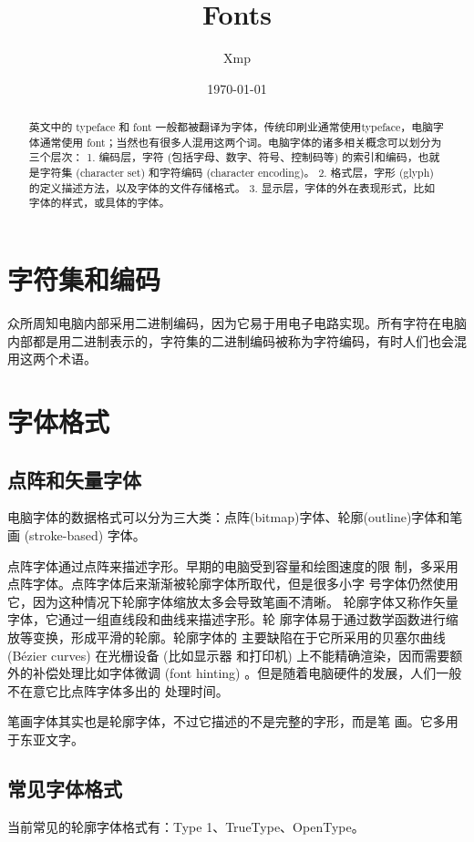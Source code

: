 \documentclass[UTF8]{article}
\title{Fonts}
\author{Xmp}
\date{\today}
\begin{document}
\maketitle
\tableofcontents
\newpage
\begin{abstract}
英文中的 typeface 和 font 一般都被翻译为字体，传统印刷业通常使用typeface，电脑字体通常使用 font；当然也有很多人混用这两个词。电脑字体的诸多相关概念可以划分为三个层次：
1. 编码层，字符 (包括字母、数字、符号、控制码等) 的索引和编码，也就是字符集 (character set) 和字符编码 (character encoding)。
2. 格式层，字形 (glyph) 的定义描述方法，以及字体的文件存储格式。
3. 显示层，字体的外在表现形式，比如字体的样式，或具体的字体。
\end{abstract}

\section{字符集和编码}	
众所周知电脑内部采用二进制编码，因为它易于用电子电路实现。所有字符在电脑内部都是用二进制表示的，字符集的二进制编码被称为字符编码，有时人们也会混用这两个术语。	

\section{字体格式}
\subsection{点阵和矢量字体}
电脑字体的数据格式可以分为三大类：点阵(bitmap)字体、轮廓(outline)字体和笔画 (stroke-based) 字体。

点阵字体通过点阵来描述字形。早期的电脑受到容量和绘图速度的限
制，多采用点阵字体。点阵字体后来渐渐被轮廓字体所取代，但是很多小字
号字体仍然使用它，因为这种情况下轮廓字体缩放太多会导致笔画不清晰。
轮廓字体又称作矢量字体，它通过一组直线段和曲线来描述字形。轮
廓字体易于通过数学函数进行缩放等变换，形成平滑的轮廓。轮廓字体的
主要缺陷在于它所采用的贝塞尔曲线 (Bézier curves) 在光栅设备 (比如显示器
和打印机) 上不能精确渲染，因而需要额外的补偿处理比如字体微调 (font
hinting) 。但是随着电脑硬件的发展，人们一般不在意它比点阵字体多出的
处理时间。

笔画字体其实也是轮廓字体，不过它描述的不是完整的字形，而是笔
画。它多用于东亚文字。	

\subsection{常见字体格式}
当前常见的轮廓字体格式有：Type 1、TrueType、OpenType。	
	
\end{document}
